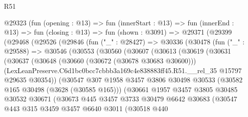 \begin{lexlean}{R51}
\begin{coremodule}
      @29323
        (fun (opening : @13) =>
        fun (innerStart : @13) =>
        fun (innerEnd : @13) =>
        fun (closing : @13) =>
        fun (shown : @3091) =>
        @29371
          (@29399
            (@29468
              (@29526
                (@29846
                  (fun ("_" : @28427) =>
                  @30336
                    (@30478
                      (fun ("_" : @29588) =>
                      @30546
                        (@30553
                          (@30560
                            (@30607
                              (@30613
                                (@30619
                                  (@30631
                                    (@30637
                                      (@30648
                                        (@30660 (@30672 (@30678 @30683 @30600)))
                                        (LexLeanPreserve.C6d1bc0bcc7cbbb3a169c4e838883ff45.R51.__rel_35
                                          @15797
                                          @29635
                                          @30354))
                                      (@30547
                                        @307
                                        @1958
                                        @3457
                                        @3806
                                        @30498
                                        @30533
                                        (@30582 @165 @30498 (@3628 (@30585 @165)))
                                        (@30661
                                          @1957
                                          @3457
                                          @3805
                                          @30485
                                          @30532
                                          @30671
                                          (@30673
                                            @445
                                            @3457
                                            @3733
                                            @30479
                                            @6642
                                            @30683
                                            (@30547
                                              @443
                                              @315
                                              @3459
                                              @3457
                                              @6640
                                              @3011
                                              (@30518
                                                @440

\end{coremodule}
\end{lexlean}
